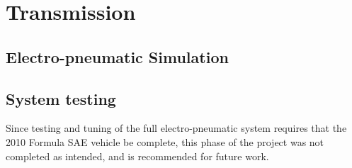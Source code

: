 \section{Transmission}

\subsection{Electro-pneumatic Simulation}


\subsection{System testing}

Since testing and tuning of the full electro-pneumatic system requires that the 2010 Formula SAE vehicle be complete, this phase of the project was not completed as intended, and is recommended for future work.